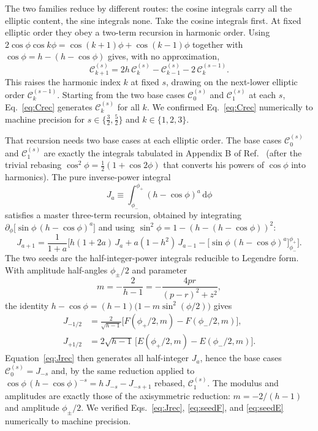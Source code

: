 \documentclass[11pt]{article}
\newcommand{\dd}{\,\mathrm{d}}
\newcommand{\Ck}[2]{\mathcal{C}^{(#2)}_{#1}}
\newcommand{\Ja}[1]{J_{#1}}
\newcommand{\Fell}{F}
\newcommand{\Eell}{E}
\begin{document}
The two families reduce by different routes: the cosine integrals carry all the elliptic content, the sine integrals none. Take the cosine integrals first. At fixed elliptic order they obey a two-term recursion in harmonic order. Using $2\cos\phi\cos k\phi=\cos(k+1)\phi+\cos(k-1)\phi$ together with $\cos\phi=h-(h-\cos\phi)$ gives, with no approximation,
\begin{equation}
\boxed{\;\Ck{k+1}{s}=2h\,\Ck{k}{s}-\Ck{k-1}{s}-2\,\Ck{k}{s-1}.\;}
\label{eq:Crec}
\end{equation}
This raises the harmonic index $k$ at fixed $s$, drawing on the next-lower elliptic order $\Ck{k}{s-1}$. Starting from the two base cases $\Ck{0}{s}$ and $\Ck{1}{s}$ at each $s$, Eq.~\eqref{eq:Crec} generates $\Ck{k}{s}$ for all $k$. We confirmed Eq.~\eqref{eq:Crec} numerically to machine precision for $s\in\{\tfrac32,\tfrac52\}$ and $k\in\{1,2,3\}$.

That recursion needs two base cases at each elliptic order. The base cases $\Ck{0}{s}$ and $\Ck{1}{s}$ are exactly the integrals tabulated in Appendix B of Ref.~\cite{schwartz2025} (after the trivial rebasing $\cos^2\phi=\tfrac12(1+\cos2\phi)$ that converts his powers of $\cos\phi$ into harmonics). The pure inverse-power integral
\begin{equation}
\Ja{a}\equiv\int_{\phi_-}^{\phi_+}(h-\cos\phi)^{a}\dd\phi
\label{eq:Ja}
\end{equation}
satisfies a master three-term recursion, obtained by integrating $\partial_\phi\!\big[\sin\phi\,(h-\cos\phi)^{a}\big]$ and using $\sin^2\phi=1-(h-(h-\cos\phi))^2$:
\begin{equation}
\boxed{\;\Ja{a+1}=\frac{1}{1+a}\Big[h(1+2a)\,\Ja{a}+a(1-h^2)\,\Ja{a-1}
-\big[\sin\phi\,(h-\cos\phi)^{a}\big]_{\phi_-}^{\phi_+}\Big].\;}
\label{eq:Jrec}
\end{equation}
The two seeds are the half-integer-power integrals reducible to Legendre form. With amplitude half-angles $\phi_\pm/2$ and parameter
\begin{equation}
m=-\frac{2}{h-1}=-\frac{4pr}{(p-r)^2+z^2},
\label{eq:modulus}
\end{equation}
the identity $h-\cos\phi=(h-1)\big(1-m\sin^2(\phi/2)\big)$ gives
\begin{align}
\Ja{-1/2}&=\frac{2}{\sqrt{h-1}}\Big[\Fell(\phi_+/2,m)-\Fell(\phi_-/2,m)\Big],\label{eq:seedF}\\
\Ja{+1/2}&=2\sqrt{h-1}\,\Big[\Eell(\phi_+/2,m)-\Eell(\phi_-/2,m)\Big].\label{eq:seedE}
\end{align}
Equation~\eqref{eq:Jrec} then generates all half-integer $\Ja{a}$, hence the base cases $\Ck{0}{s}=\Ja{-s}$ and, by the same reduction applied to $\cos\phi\,(h-\cos\phi)^{-s}=h\,\Ja{-s}-\Ja{-s+1}$ rebased, $\Ck{1}{s}$. The modulus and amplitudes are exactly those of the axisymmetric reduction: $m=-2/(h-1)$ and amplitude $\phi_\pm/2$. We verified Eqs.~\eqref{eq:Jrec}, \eqref{eq:seedF}, and \eqref{eq:seedE} numerically to machine precision.
\end{document}

